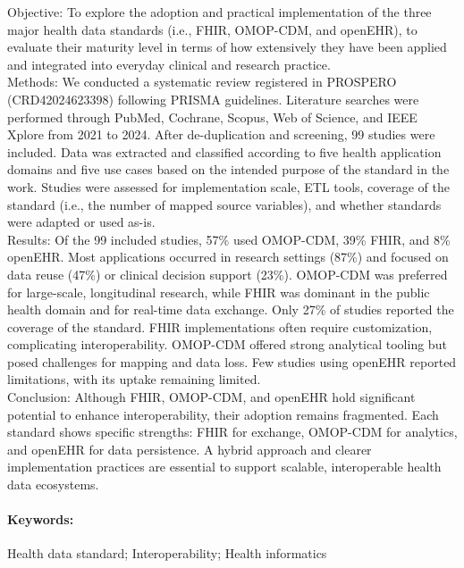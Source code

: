 \begin{paperabstract}

Objective: To explore the adoption and practical implementation of the three major health data standards (i.e., FHIR, OMOP-CDM, and openEHR), to evaluate their maturity level in terms of how extensively they have been applied and integrated into everyday clinical and research practice.\\
Methods: We conducted a systematic review registered in PROSPERO (CRD42024623398) following PRISMA guidelines. Literature searches were performed through PubMed, Cochrane, Scopus, Web of Science, and IEEE Xplore from 2021 to 2024. After de-duplication and screening, 99 studies were included. Data was extracted and classified according to five health application domains and five use cases based on the intended purpose of the standard in the work. Studies were assessed for implementation scale, ETL tools, coverage of the standard (i.e., the number of mapped source variables), and whether standards were adapted or used as-is.\\
Results: Of the 99 included studies, 57\% used OMOP-CDM, 39\% FHIR, and 8\% openEHR. Most applications occurred in research settings (87\%) and focused on data reuse (47\%) or clinical decision support (23\%). OMOP-CDM was preferred for large-scale, longitudinal research, while FHIR was dominant in the public health domain and for real-time data exchange. Only 27\% of studies reported the coverage of the standard. FHIR implementations often require customization, complicating interoperability. OMOP-CDM offered strong analytical tooling but posed challenges for mapping and data loss. Few studies using openEHR reported limitations, with its uptake remaining limited.\\
Conclusion: Although FHIR, OMOP-CDM, and openEHR hold significant potential to enhance interoperability, their adoption remains fragmented. Each standard shows specific strengths: FHIR for exchange, OMOP-CDM for analytics, and openEHR for data persistence. A hybrid approach and clearer implementation practices are essential to support scalable, interoperable health data ecosystems.
\end{paperabstract}

\paragraph{Keywords:} Health data standard; Interoperability; Health informatics

